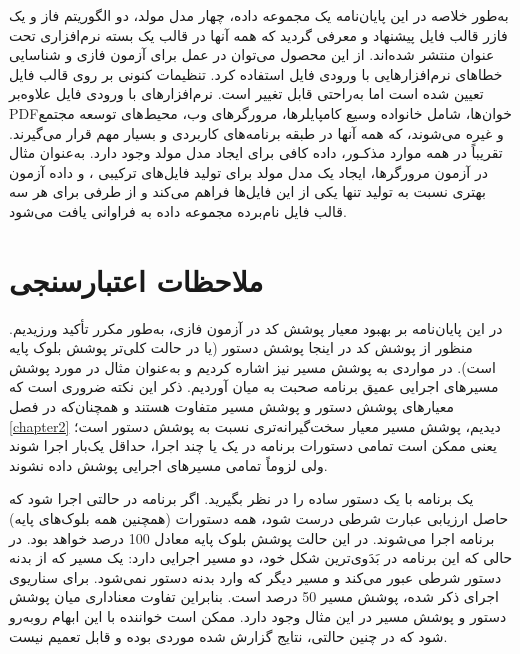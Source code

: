 {\begin{enumerate}
\end{enumerate}
به‌طور خلاصه در این پایان‌نامه یک مجموعه داده، چهار مدل مولد، دو الگوریتم فاز و یک فازر قالب فایل پیشنهاد و معرفی گردید که همه آنها در قالب یک بسته نرم‌افزاری تحت عنوان  منتشر شده‌اند. از این محصول می‌توان در عمل برای آزمون فازی و شناسایی خطاهای نرم‌افزارهایی با ورودی فایل استفاده کرد. تنظیمات کنونی بر روی قالب فایل  تعیین شده است اما به‌راحتی قابل تغییر است. نرم‌افزارهای با ورودی فایل علاوه‌بر \gls{PDF}خوان‌ها، شامل خانواده وسیع کامپایلرها، مرورگرهای وب، محیط‌های توسعه مجتمع و غیره می‌شوند، که همه آنها در طبقه برنامه‌های کاربردی و بسیار مهم قرار می‌گیرند. تقریباً در همه موارد مذکـور، داده کافی برای ایجاد مدل مولد وجود دارد. به‌عنوان مثال در آزمون مرورگرها، ایجاد یک مدل مولد برای تولید فایل‌های ترکیبی ،  و  داده آزمون بهتری نسبت به تولید تنها یکی از این فایل‌ها 
\cite{yaghoubi1392}
فراهم می‌کند و از طرفی برای هر سه قالب فایل نام‌برده مجموعه داده به فراوانی یافت می‌شود.




\section{ملاحظات اعتبارسنجی}
در این پایان‌نامه بر بهبود معیار پوشش کد در آزمون فازی، به‌طور مکرر تأکید ورزیدیم. منظور از پوشش کد در اینجا پوشش دستور (یا در حالت کلی‌تر پوشش بلوک پایه است). در مواردی به پوشش مسیر نیز اشاره کردیم و به‌عنوان مثال در مورد پوشش مسیرهای اجرایی عمیق برنامه صحبت به میان آوردیم. ذکر این نکته ضروری است که معیارهای پوشش دستور و پوشش مسیر متفاوت هستند و همچنان‌که در فصل 
\ref{chapter2}
 دیدیم، پوشش مسیر معیار سخت‌گیرانه‌تری نسبت به پوشش دستور است؛ یعنی ممکن است تمامی دستورات برنامه در یک یا چند اجرا، حداقل یک‌بار اجرا شوند ولی لزوماً تمامی مسیرهای اجرایی پوشش داده نشوند. 

یک برنامه با یک دستور 
ساده را در نظر بگیرید. اگر برنامه در حالتی اجرا شود که حاصل ارزیابی عبارت شرطی درست شود، همه دستورات (همچنین همه بلوک‌های پایه) برنامه اجرا می‌شوند. در این حالت پوشش بلوک پایه معادل 100 درصد خواهد بود. در حالی که این برنامه در بَدَوی‌ترین شکل خود، دو مسیر اجرایی دارد: یک مسیر که از بدنه دستور شرطی 
عبور می‌کند و مسیر دیگر که وارد بدنه دستور 
نمی‌شود. برای سناریوی اجرای ذکر شده، پوشش مسیر 50 درصد است. بنابراین تفاوت معناداری میان پوشش دستور و پوشش مسیر در این مثال وجود دارد. ممکن است خواننده با این ابهام روبه‌رو شود که در چنین حالتی، نتایج گزارش شده موردی بوده و قابل تعمیم نیست.

}

